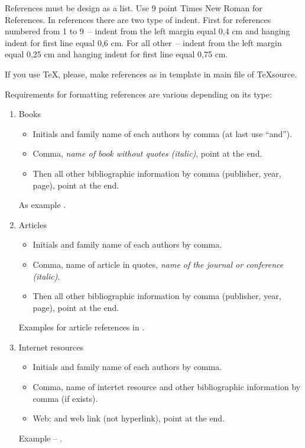 References must be design as a list. Use 9 point Times New Roman for References. In references there are two type of indent. First for references numbered from 1 to 9~-- indent from the left margin equal 0,4 cm and hanging indent for first line equal 0,6 cm. For all other~-- indent from the left margin equal 0,25 cm and hanging indent for first line equal 0,75 cm.

If you use \TeX, please, make references as in template in main file of \TeX  source. 

Requirements for formatting references are various depending on its type:
\begin{enumerate}
	\item Books
	
	\begin{itemize}
		\item Initials and family name of each authors by comma (at last use ``and'').
		\item Comma, \textit{name of book without quotes (italic)}, point at the end.
		\item Then all other bibliographic information by comma (publisher, year, page), point at the end.
	\end{itemize}	
	
	As example \cite{Cover}.
	\item Articles
	
	\begin{itemize}
		\item Initials and family name of each authors by comma.
		\item Comma, name of article in quotes, \textit{name of the journal or conference (italic)}.
		\item Then all other bibliographic information by comma (publisher, year, page), point at the end.
	\end{itemize}	
	
	Examples for article references in \cite{Dobrushin, Blachman}.
	\item Internet resources
	
	\begin{itemize}
		\item Initials and family name of each authors by comma.
		\item Comma, name of intertet resource and other bibliographic information by comma (if exists).
		\item Web: and web link (not hyperlink), point at the end.
	\end{itemize}	
	
	Example -- \cite{IEEE}.
\end{enumerate}